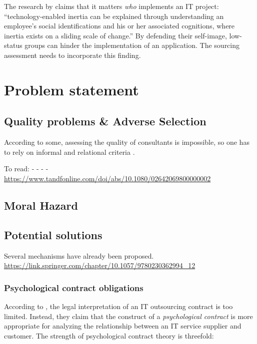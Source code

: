 \documentclass[12pt]{article}
\begin{document}
The research by \citet[311-313]{schwarz2005} claims that it matters
\emph{who} implements an IT project: ``technology-enabled inertia can be
explained through understanding an employee's social identifications and
his or her associated cognitions, where inertia exists on a sliding
scale of change.'' By defending their self-image, low-status groups can
hinder the implementation of an application. The sourcing assessment
needs to incorporate this finding.

\hypertarget{problem-statement}{%
\section{Problem statement}\label{problem-statement}}

\hypertarget{quality-problems-adverse-selection}{%
\subsection{Quality problems \& Adverse
Selection}\label{quality-problems-adverse-selection}}

According to some, assessing the quality of consultants is impossible,
so one has to rely on informal and relational criteria \citep[
277]{wright2002}.

To read: - \citet{wright2002} - \citet{david2013} - \citet{mahoney2016}
- \url{https://www.tandfonline.com/doi/abs/10.1080/02642069800000002}

\hypertarget{moral-hazard}{%
\subsection{Moral Hazard}\label{moral-hazard}}

\hypertarget{potential-solutions}{%
\subsection{Potential solutions}\label{potential-solutions}}

Several mechanisms have already been proposed.
\url{https://link.springer.com/chapter/10.1057/9780230362994_12}

\hypertarget{psychological-contract-obligations}{%
\subsubsection{Psychological contract
obligations}\label{psychological-contract-obligations}}

According to \citet[357]{ang2004}, the legal interpretation of an IT
outsourcing contract is too limited. Instead, they claim that the
construct of a \emph{psychological contract} is more appropriate for
analyzing the relationship between an IT service supplier and customer.
The strength of psychological contract theory is threefold:
\end{document}
